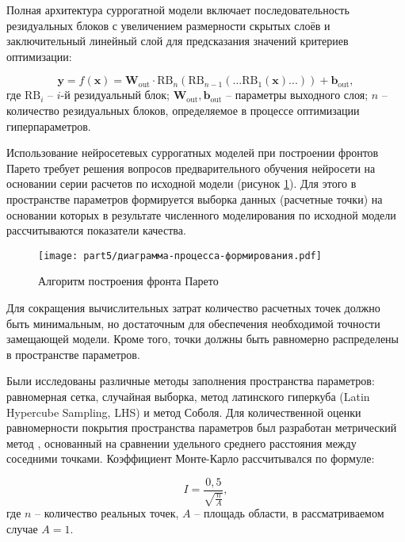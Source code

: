 Полная архитектура суррогатной модели включает последовательность резидуальных блоков
с увеличением размерности скрытых слоёв и заключительный линейный слой
для предсказания значений критериев оптимизации:

\begin{equation}
	\mathbf{y} = f(\mathbf{x}) = \mathbf{W}_\text{out} \cdot \text{RB}_n(\text{RB}_{n-1}(...\text{RB}_1(\mathbf{x})...)) + \mathbf{b}_\text{out},
\end{equation}
где $\text{RB}_i$ -- $i$-й резидуальный блок;
$\mathbf{W}_\text{out}, \mathbf{b}_\text{out}$ -- параметры выходного слоя;
$n$ -- количество резидуальных блоков, определяемое в процессе оптимизации гиперпараметров.

Использование нейросетевых суррогатных моделей при построении фронтов Парето
требует решения вопросов предварительного обучения нейросети на основании серии
расчетов по исходной модели (рисунок \ref{fig:process-diagram}). Для этого в пространстве
параметров формируется выборка данных (расчетные точки) на основании
которых в результате численного моделирования по исходной модели
рассчитываются показатели качества.

\begin{figure}[h]
	\centering
	\texttt{[image: part5/диаграмма-процесса-формирования.pdf]}
	\caption{Алгоритм построения фронта Парето}
	\label{fig:process-diagram}
	
\end{figure}

Для сокращения вычислительных затрат количество расчетных точек должно быть минимальным,
но достаточным для обеспечения необходимой точности замещающей модели.
Кроме того, точки должны быть равномерно распределены в пространстве параметров.

Были исследованы различные методы заполнения пространства параметров: равномерная сетка,
случайная выборка, метод латинского гиперкуба (Latin Hypercube Sampling, LHS) и метод Соболя.
Для количественной оценки равномерности покрытия пространства параметров был разработан метрический метод \cite{pub21},
основанный на сравнении удельного среднего расстояния между соседними точками.
Коэффициент Монте-Карло рассчитывался по формуле:

\begin{equation}
	I = \frac{0,5}{\sqrt{\frac{n}{A}}},
\end{equation}
где $n$ -- количество реальных точек, $A$ -- площадь области, в рассматриваемом случае $A = 1$.

